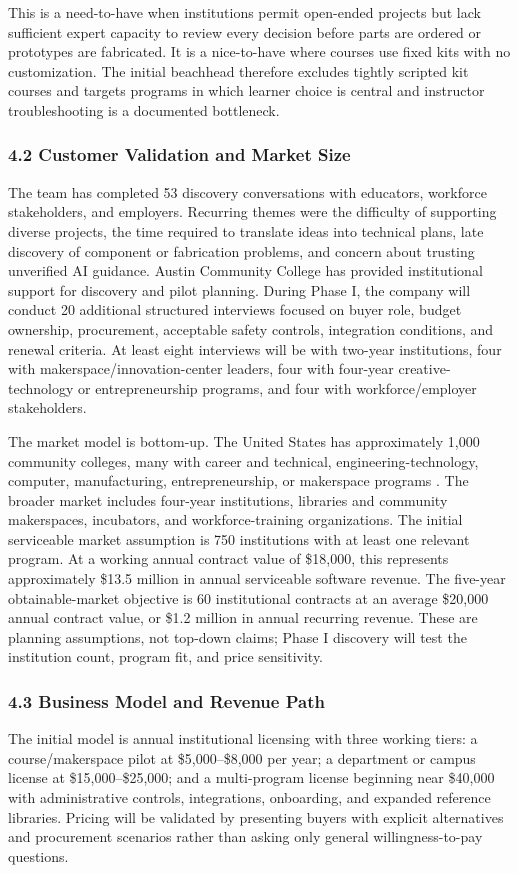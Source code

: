 \documentclass[11pt,letterpaper]{article}
\begin{document}
This is a need-to-have when institutions permit open-ended projects but lack sufficient expert capacity to review every decision before parts are ordered or prototypes are fabricated. It is a nice-to-have where courses use fixed kits with no customization. The initial beachhead therefore excludes tightly scripted kit courses and targets programs in which learner choice is central and instructor troubleshooting is a documented bottleneck.

\subsubsection*{4.2 Customer Validation and Market Size}
The team has completed 53 discovery conversations with educators, workforce stakeholders, and employers. Recurring themes were the difficulty of supporting diverse projects, the time required to translate ideas into technical plans, late discovery of component or fabrication problems, and concern about trusting unverified AI guidance. Austin Community College has provided institutional support for discovery and pilot planning. During Phase I, the company will conduct 20 additional structured interviews focused on buyer role, budget ownership, procurement, acceptable safety controls, integration conditions, and renewal criteria. At least eight interviews will be with two-year institutions, four with makerspace/innovation-center leaders, four with four-year creative-technology or entrepreneurship programs, and four with workforce/employer stakeholders.

The market model is bottom-up. The United States has approximately 1,000 community colleges, many with career and technical, engineering-technology, computer, manufacturing, entrepreneurship, or makerspace programs \cite{aacc2025fastfacts}. The broader market includes four-year institutions, libraries and community makerspaces, incubators, and workforce-training organizations. The initial serviceable market assumption is 750 institutions with at least one relevant program. At a working annual contract value of \$18,000, this represents approximately \$13.5 million in annual serviceable software revenue. The five-year obtainable-market objective is 60 institutional contracts at an average \$20,000 annual contract value, or \$1.2 million in annual recurring revenue. These are planning assumptions, not top-down claims; Phase I discovery will test the institution count, program fit, and price sensitivity.

\subsubsection*{4.3 Business Model and Revenue Path}
The initial model is annual institutional licensing with three working tiers: a course/makerspace pilot at \$5,000--\$8,000 per year; a department or campus license at \$15,000--\$25,000; and a multi-program license beginning near \$40,000 with administrative controls, integrations, onboarding, and expanded reference libraries. Pricing will be validated by presenting buyers with explicit alternatives and procurement scenarios rather than asking only general willingness-to-pay questions.
\end{document}
